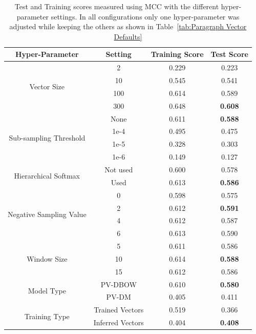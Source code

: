 \begin{table}[h]
  \begin{center}
    \begin{tabular}{ c | c | c | c }
      \toprule
      Hyper-Parameter & Setting & Training Score & Test Score \\
      \midrule
      \multirow{4}{*}{Vector Size}
       & 2 & 0.229 & 0.223 \\
       & 10  & 0.545 & 0.541 \\
       & 100 & 0.614 & 0.589 \\
       & 300 & 0.648 & \textbf{0.608} \\
      \midrule
      \multirow{4}{*}{Sub-sampling Threshold}
       & None & 0.611 & \textbf{0.588} \\
       & 1e-4 & 0.495 & 0.475 \\
       & 1e-5 & 0.328 & 0.303 \\
       & 1e-6 & 0.149 & 0.127 \\
      \midrule
      \multirow{2}{*}{Hierarchical Softmax}
       & Not used & 0.600 & 0.578 \\
       & Used     & 0.613 & \textbf{0.586} \\
      \midrule
      \multirow{4}{*}{Negative Sampling Value}
       & 0 & 0.598 & 0.575 \\
       & 2 & 0.612 & \textbf{0.591} \\
       & 4 & 0.612 & 0.587 \\
       & 6 & 0.613 & 0.590 \\
      \midrule
      \multirow{3}{*}{Window Size}
       & 5  & 0.611 & 0.586 \\
       & 10 & 0.614 & \textbf{0.588} \\
       & 15 & 0.612 & 0.586 \\
      \midrule
      \multirow{2}{*}{Model Type}
       & PV-DBOW & 0.610 & \textbf{0.580} \\
       & PV-DM   & 0.405 & 0.411 \\
      \midrule
      \multirow{2}{*}{Training Type}
       & Trained Vectors  & 0.519 & 0.366 \\
       & Inferred Vectors & 0.404 & \textbf{0.408} \\
      \bottomrule
    \end{tabular}
  \caption{Test and Training scores measured using \gls{MCC} with the different hyper-parameter settings. In all configurations only one hyper-parameter was adjusted while keeping the others as shown in Table~\ref{tab:Paragraph Vector Defaults}}
\label{tab:Paragraph Vector Parameter Hyper-Parameter Results}
\end{center}
\end{table}

